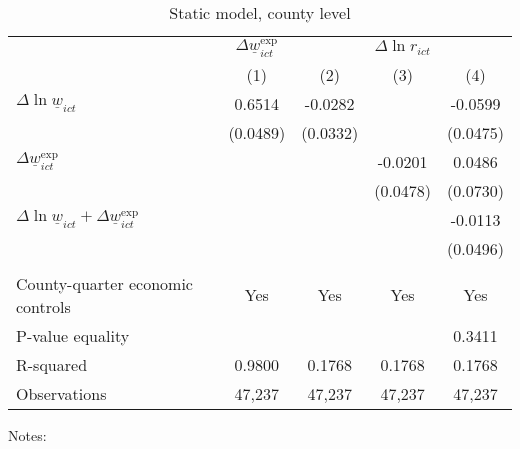 \begin{table}
    \caption{Static model, county level}
    \label{tab:static_county}

    \begin{tabular}{l*{4}{c}}
    \toprule
     & \multicolumn{1}{c}{$\Delta \underline{w}_{ict}^{\text{exp}}$}
     & \multicolumn{3}{c}{$\Delta \ln r_{ict}$}                                  \\ \cmidrule(lr){2-2}\cmidrule(lr){3-5}
     & \multicolumn{1}{c}{(1)} & \multicolumn{1}{c}{(2)} 
     & \multicolumn{1}{c}{(3)} & \multicolumn{1}{c}{(4)}                         \\ \midrule
    $\Delta \ln \underline{w}_{ict}$          &  0.6514  &  -0.0282  &       &  -0.0599     \\
                                              & (0.0489) & (0.0332) &       & (0.0475)    \\
    $\Delta \underline{w}_{ict}^{\text{exp}}$ &       &       &  -0.0201  & 0.0486      \\
                                              &       &       & (0.0478) & (0.0730)    \\ \midrule
    $\Delta \ln \underline{w}_{ict}+
      \Delta \underline{w}_{ict}^{\text{exp}}$&       &       &       &  -0.0113     \\
                                              &       &       &       & (0.0496)    \\
                                              &       &       &       &          \\ \midrule
    County-quarter economic controls          &  Yes  & Yes   & Yes   & Yes      \\
    P-value equality                          &       &       &       & 0.3411      \\
    R-squared                                 &  0.9800  &  0.1768  &  0.1768  & 0.1768      \\
    Observations                              & 47,237  & 47,237  & 47,237  & 47,237     \\\bottomrule
    \end{tabular}

    \begin{minipage}{.95\textwidth} \footnotesize
        \vspace{2mm}
        Notes: 
    \end{minipage}
\end{table}
